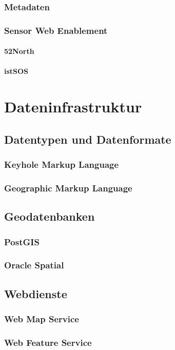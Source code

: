\subsubsection{Metadaten}
\subsubsection{Sensor Web Enablement}
\paragraph{52North}
\paragraph{istSOS}

\section{Dateninfrastruktur}
\subsection{Datentypen und Datenformate}
\subsubsection{Keyhole Markup Language}
\subsubsection{Geographic Markup Language}
\subsection{Geodatenbanken}
\subsubsection{PostGIS}
\subsubsection{Oracle Spatial}
\subsection{Webdienste}
\subsubsection{Web Map Service}
\subsubsection{Web Feature Service}
